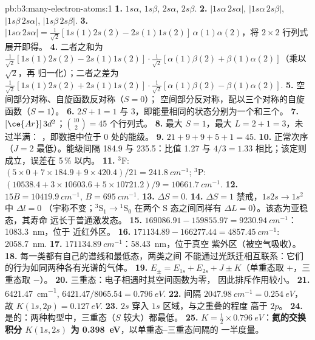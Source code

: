 \begin{solution}{pb:b3:many-electron-atoms:1}
\textbf{1.} $1s\alpha$, $1s\beta$, $2s\alpha$, $2s\beta$.
\textbf{2.} $|1s\alpha\,2s\alpha|$, $|1s\alpha\,2s\beta|$, $|1s\beta\,2s\alpha|$,
$|1s\beta\,2s\beta|$.
\textbf{3.} $|1s\alpha\,2s\alpha| = \frac{1}{\sqrt2}[1s(1)2s(2) - 2s(1)1s(2)]\,
\alpha(1)\alpha(2)$，将 $2\times2$ 行列式展开即得。
\textbf{4.} 二者之和为 $\frac{1}{\sqrt2}[1s(1)2s(2) - 2s(1)1s(2)]\cdot
\frac{1}{\sqrt2}[\alpha(1)\beta(2) + \beta(1)\alpha(2)]$（乘以 $\sqrt2$，再
归一化）；二者之差为 $\frac{1}{\sqrt2}[1s(1)2s(2) +
2s(1)1s(2)]\cdot\frac{1}{\sqrt2}[\alpha(1)\beta(2) - \beta(1)\alpha(2)]$.
\textbf{5.} 空间部分对称、自旋函数反对称（$S = 0$）；
空间部分反对称，配以三个对称的自旋函数（$S = 1$）。
\textbf{6.} $2S + 1 = 1$ 与 3，即能量相同的状态分别为一个和三个。
\textbf{7.} $[\ce{Ar}]\,3d^2$；$\binom{10}{2} = 45$ 个行列式。
\textbf{8.} 最大 $S = 1$，最大 $L = 2 + 1 = 3$，未过半满：
，即数据中位于 0 处的能级。
\textbf{9.} $21 + 9 + 9 + 5 + 1 = 45$.
\textbf{10.} 正常次序（$J = 2$ 最低）。能级间隔 184.9 与 235.5：比值 1.27
与 $4/3 = 1.33$ 相比；该定则成立，误差在 5\,\% 以内。
\textbf{11.} ${}^3$F: $(5 \times 0 + 7 \times 184.9 + 9 \times 420.4)/21 =
\qty{241.8}{cm^{-1}}$; ${}^3$P: $(10538.4 + 3 \times 10603.6 + 5 \times
10721.2)/9 = \qty{10661.7}{cm^{-1}}$.
\textbf{12.} $15B = \qty{10419.9}{cm^{-1}}$, $B = \qty{695}{cm^{-1}}$.
\textbf{13.} $\Delta S = 0$.
\textbf{14.} $\Delta S = 1$ 禁戒，$1s2s \to 1s^2$ 中 $\Delta l = 0$
（宇称不变；${}^3$S$_1 \to {}^1$S$_0$ 在两个 S
态之间同样有 $\Delta L = 0$）。该态为亚稳态，其寿命
远长于普通激发态。
\textbf{15.} $169086.91 - 159855.97 = \qty{9230.94}{cm^{-1}}$：\qty{1083.3}{nm}，位于
近红外区。
\textbf{16.} $171134.89 - 166277.44 = \qty{4857.45}{cm^{-1}}$: \qty{2058.7}{nm}.
\textbf{17.} $\qty{171134.89}{cm^{-1}}$：\qty{58.43}{nm}，位于真空
紫外区（被空气吸收）。
\textbf{18.} 每一类都有自己的谱线和最低态，两类之间
不能通过光跃迁相互联系：它们的行为如同两种各有光谱的气体。
\textbf{19.} $E_\pm = E_{1s} + E_{2s} + J \pm K$（单重态取 $+$，三重态取 $-$）。
\textbf{20.} 三重态：电子相遇时其空间函数为零，
因此排斥作用较小。
\textbf{21.} \qty{6421.47}{cm^{-1}}, $6421.47/8065.54 = \qty{0.796}{eV}$.
\textbf{22.} 间隔 $\qty{2047.98}{cm^{-1}} = \qty{0.254}{eV}$，故 $K(1s,2p) =
\qty{0.127}{eV}$.
\textbf{23.} $2s$ 穿入 $1s$ 区域，与之重叠的程度
高于 $2p$。
\textbf{24.} 是的：两种构型中，三重态（$S$ 较大）都最低。
\textbf{25.} $K = \frac12 \times \qty{0.796}{eV}$：\textbf{氦的交换
积分 $K(1s,2s)$ 为 \qty{0.398}{eV}}，以单重态–三重态间隔的
一半度量。
\end{solution}
